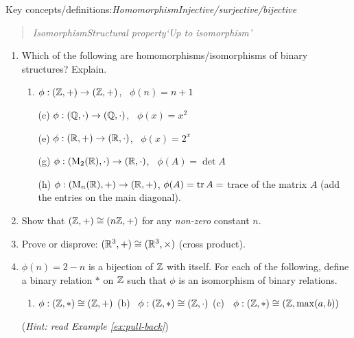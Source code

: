 \begin{exercises}{}
	Key concepts/definitions:\quad \emph{Homomorphism\quad Injective/surjective/bijective}
	\begin{quote}
		\emph{Isomorphism\quad Structural property\quad `Up to isomorphism'}
	\end{quote}
	
	\begin{enumerate}
		\item Which of the following are homomorphisms/isomorphisms of binary structures? Explain.
	  \begin{enumerate}
	    \item {} $\phi:(\mathbb{Z},+)\to (\mathbb{Z},+)$, \ $\phi(n)=n+1$
	    
	    \item[(c)]  $\phi:(\mathbb{Q},\cdot)\to (\mathbb{Q},\cdot)$, \ $\phi(x)=x^2$
	    
	    \item[(e)]  $\phi:(\mathbb{R},+)\to (\mathbb{R},\cdot)$, \ $\phi(x)=2^x$
	    
	    \item[(g)] $\phi:(\mathrm{M}_2(\mathbb{R}),\cdot)\to (\mathbb{R},\cdot)$, \ $\phi(A)=\det A$
	    
	    \item[(h)] $\phi:(\mathrm{M}_n(\mathbb{R}),+)\to (\mathbb{R},+)$, $\phi(A)=\operatorname{tr} A=$ trace of the matrix $A$ (add the entries on the main diagonal).
	  \end{enumerate}
	  
	  
	  \item Show that $(\mathbb{Z},+)\cong (n\mathbb{Z},+)$ for any \emph{non-zero} constant $n$.
	  
	  
	  \item Prove or disprove: $(\mathbb{R}^3,+)\cong(\mathbb{R}^3,\times)$ (cross product). 
	  
	  
	  \item $\phi(n)=2-n$ is a bijection of $\mathbb{Z}$ with itself. For each of the following, define a binary relation $*$ on $\mathbb{Z}$ such that $\phi$ is an isomorphism of binary relations.
	  \begin{enumerate}
	    \item $\phi:(\mathbb{Z},*)\cong (\mathbb{Z},+)$\quad\qquad
	    (b) \ $\phi:(\mathbb{Z},*)\cong (\mathbb{Z},\cdot)$\quad\qquad 
	    (c) \ $\phi:(\mathbb{Z},*)\cong (\mathbb{Z},\max(a,b))$
	  \end{enumerate}
	  (\emph{Hint: read Example \ref{ex:pull-back}})
	  

\end{enumerate}
\end{exercises}
